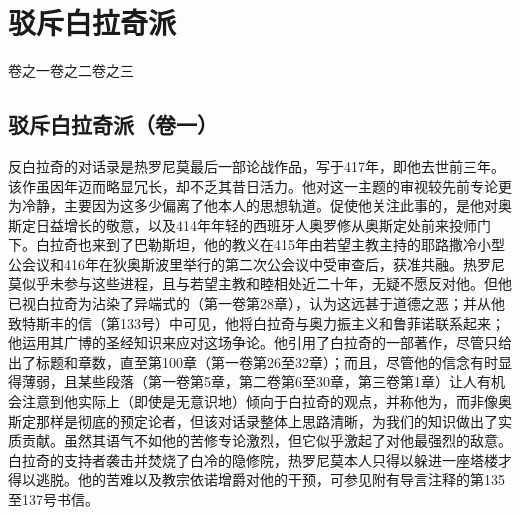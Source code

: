 
\chapter{驳斥白拉奇派}


卷之一\newline{}卷之二\newline{}卷之三\par



\section{驳斥白拉奇派（卷一）}

反白拉奇的对话录是热罗尼莫最后一部论战作品，写于417年，即他去世前三年。该作虽因年迈而略显冗长，却不乏其昔日活力。他对这一主题的审视较先前专论更为冷静，主要因为这多少偏离了他本人的思想轨道。促使他关注此事的，是他对奥斯定日益增长的敬意，以及414年年轻的西班牙人奥罗修从奥斯定处前来投师门下。白拉奇也来到了巴勒斯坦，他的教义在415年由若望主教主持的耶路撒冷小型公会议和416年在狄奥斯波里举行的第二次公会议中受审查后，获准共融。热罗尼莫似乎未参与这些进程，且与若望主教和睦相处近二十年，无疑不愿反对他。但他已视白拉奇为沾染了异端式的（第一卷第28章），认为这远甚于道德之恶；并从他致特斯丰的信（第133号）中可见，他将白拉奇与奥力振主义和鲁菲诺联系起来；他运用其广博的圣经知识来应对这场争论。他引用了白拉奇的一部著作，尽管只给出了标题和章数，直至第100章（第一卷第26至32章）；而且，尽管他的信念有时显得薄弱，且某些段落（第一卷第5章，第二卷第6至30章，第三卷第1章）让人有机会注意到他实际上（即使是无意识地）倾向于白拉奇的观点，并称他为，而非像奥斯定那样是彻底的预定论者，但该对话录整体上思路清晰，为我们的知识做出了实质贡献。虽然其语气不如他的苦修专论激烈，但它似乎激起了对他最强烈的敌意。白拉奇的支持者袭击并焚烧了白冷的隐修院，热罗尼莫本人只得以躲进一座塔楼才得以逃脱。他的苦难以及教宗依诺增爵对他的干预，可参见附有导言注释的第135至137号书信。\par

